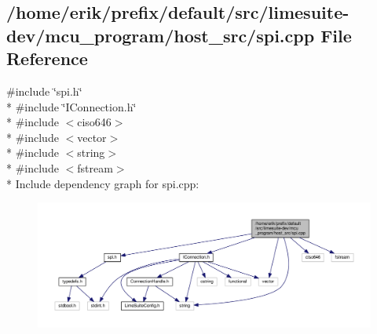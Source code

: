 \subsection{/home/erik/prefix/default/src/limesuite-\/dev/mcu\+\_\+program/host\+\_\+src/spi.cpp File Reference}
\label{spi_8cpp}
{\ttfamily \#include \char`\"{}spi.\+h\char`\"{}}\\*
{\ttfamily \#include \char`\"{}I\+Connection.\+h\char`\"{}}\\*
{\ttfamily \#include $<$ciso646$>$}\\*
{\ttfamily \#include $<$vector$>$}\\*
{\ttfamily \#include $<$string$>$}\\*
{\ttfamily \#include $<$fstream$>$}\\*
Include dependency graph for spi.\+cpp\+:
\nopagebreak
\begin{figure}[H]
\begin{center}
\leavevmode
\includegraphics[width=350pt]{dd/d59/spi_8cpp__incl}
\end{center}
\end{figure}
